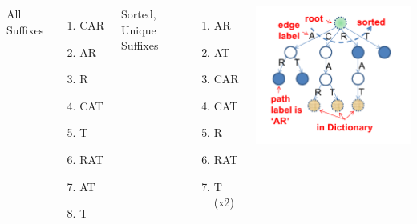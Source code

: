 \begin{frame}
{    \begin{columns}[T]
      All Suffixes
      \begin{enumerate}
      \item CAR
      \item AR
      \item R
      \item CAT
      \item T
      \item RAT
      \item AT
      \item T
      \end{enumerate}
      Sorted, Unique Suffixes
      \begin{enumerate}
      \item AR
      \item AT
      \item CAR
      \item CAT
      \item R
      \item RAT
      \item T (x2)
      \end{enumerate}
      \includegraphics[width=.9\textwidth]{../img/suffixtrie_halim}\\
    \end{columns}
  }
\end{frame}

